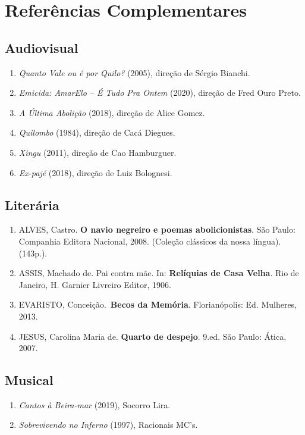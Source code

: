 \documentclass[12pt]{extarticle}
\begin{document}
\section{Referências Complementares}

\subsection{Audiovisual}

\begin{enumerate}
\item
  \emph{Quanto Vale ou é por Quilo?} (2005), direção de Sérgio Bianchi.
\item
  \emph{Emicida: AmarElo -- É Tudo Pra Ontem} (2020), direção de Fred
  Ouro Preto.
\item
  \emph{A Última Abolição} (2018), direção de Alice Gomez.
\item
  \emph{Quilombo} (1984), direção de Cacá Diegues.
\item
  \emph{Xingu} (2011), direção de Cao Hamburguer.
\item
  \emph{Ex-pajé} (2018), direção de Luiz Bolognesi.
\end{enumerate}

\subsection{Literária}

\begin{enumerate}
\item
  ALVES, Castro. \textbf{O navio negreiro e poemas abolicionistas}. São
  Paulo: Companhia Editora Nacional, 2008. (Coleção clássicos da nossa
  língua). (143p.).
\item
  ASSIS, Machado de. Pai contra mãe. In: \textbf{Relíquias de Casa
  Velha}. Rio de Janeiro, H. Garnier Livreiro Editor, 1906.
\item
  EVARISTO, Conceição.~\textbf{Becos da Memória}. Florianópolis: Ed.
  Mulheres, 2013.
\item
  JESUS, Carolina Maria de. \textbf{Quarto de despejo}. 9.ed. São Paulo:
  Ática, 2007.
\end{enumerate}

\subsection{Musical}

\begin{enumerate}
\item
  \emph{Cantos à Beira-mar} (2019), Socorro Lira.
\item
  \emph{Sobrevivendo no Inferno} (1997), Racionais MC's.
\end{enumerate}
\end{document}
